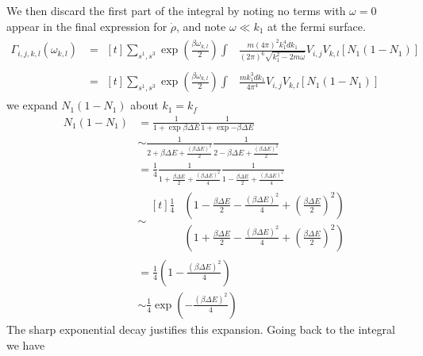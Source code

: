 We then discard the first part of the integral by noting no
terms with \(\omega = 0\) appear in the
final expression for \(\dot{\rho}\), and note
\(\omega \ll k_1\) at the fermi surface.
\begin{align}
    \Gamma_{i,j, k,l}(\omega_{k,l}) & =\begin{aligned}[t]
        \sum_{s^1,s^3} \exp{(\frac{\beta \omega_{k,l}}{2})} \int &
        \frac{m{(4\pi)}^2 k_1^4 dk_1}{{(2\pi)}^6\sqrt{k_1^2 - 2m\omega}}
        V_{i,j} V_{k,l} [ N_1 (1 - N_1)]
    \end{aligned} \\
                                    & =\begin{aligned}[t]
        \sum_{s^1,s^3} \exp{(\frac{\beta \omega_{k,l}}{2})} \int &
        \frac{m k_1^3 dk_1}{4\pi^4}
        V_{i,j} V_{k,l} [ N_1 (1 - N_1)]
    \end{aligned}
\end{align}
we expand \(N_1 (1 - N_1)\) about \(k_1 = k_f\)
\begin{align}
    N_1 (1 - N_1) & = \frac{1}{1 + \exp{\beta \Delta E}}
    \frac{1}{1 + \exp{-\beta \Delta E}}                                                \\
                  & \sim \frac{1}{2 + \beta \Delta E + \frac{{(\beta \Delta E)}^2}{2}}
    \frac{1}{2 - \beta \Delta E + \frac{{(\beta \Delta E)}^2}{2}}                      \\
                  & = \frac{1}{4}
    \frac{1}{1 + \frac{\beta \Delta E}{2} + \frac{{(\beta \Delta E)}^2}{4}}
    \frac{1}{1 - \frac{\beta \Delta E}{2} + \frac{{(\beta \Delta E)}^2}{4}}            \\
                  & \sim \begin{aligned}[t]
        \frac{1}{4}
         & (1 - \frac{\beta \Delta E}{2} - \frac{{(\beta \Delta E)}^2}{4} + {(\frac{\beta \Delta E}{2})}^2) \\
         & (1 + \frac{\beta \Delta E}{2} - \frac{{(\beta \Delta E)}^2}{4} + {(\frac{\beta \Delta E}{2})}^2)
    \end{aligned}                                    \\
                  & = \frac{1}{4}(1 - \frac{{(\beta \Delta E)}^2}{4})                  \\
                  & \sim \frac{1}{4}\exp{(- \frac{{(\beta \Delta E)}^2}{4})}
\end{align}
The sharp exponential decay justifies
this expansion. Going back to the
integral we have
